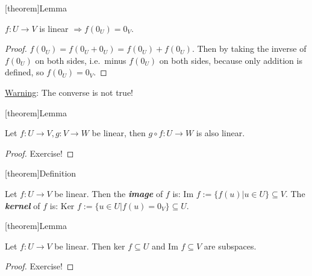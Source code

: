 \documentclass[12pt]{report}
\theoremstyle{definition}
\begin{document}
[theorem]{Lemma}
\begin{0v linear map}
    $f:U\rightarrow{}V$ is linear $\Rightarrow{} f(0_U) = 0_V$.
\end{0v linear map}

\begin{proof}
    $f(0_U) = f(0_U + 0_U) = f(0_U) + f(0_U)$.
    Then by taking the inverse of $f(0_U)$ on both sides,
    i.e.\ minus $f(0_U)$ on both sides, because only addition is defined,
    so $f(0_U) = 0_V$.
\end{proof}

\underline{Warning}: The converse is not true!

[theorem]{Lemma}
\begin{composite function is linear}
    Let $f:U\rightarrow{}V, g:V\rightarrow{}W$ be linear,
    then $g\circ f : U\rightarrow{}W$ is also linear.
\end{composite function is linear}

\begin{proof}
    Exercise!
\end{proof}

[theorem]{Definition}
\begin{image of function}
    Let $f:U\rightarrow{}V$ be linear.
    Then the \textbf{\emph{image}} of $f$ is: Im $f:= \{f(u) | u \in U \} \subseteq V$.
    The \textbf{\emph{kernel}} of $f$ is: Ker $f:=\{u \in U | f(u) = 0_V\} \subseteq U$.
\end{image of function}

[theorem]{Lemma}
\begin{ker and im are subspaces}
    Let $f:U\rightarrow{}V$ be linear. 
    Then ker $f\subseteq U$ and Im $f\subseteq V$ are subspaces.
\end{ker and im are subspaces}

\begin{proof}
    Exercise!
\end{proof}
\end{document}
